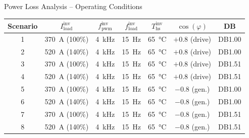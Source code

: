 \documentclass[aspectratio=169, 10pt]{beamer}
\begin{document}
\begin{frame}{Power Loss Analysis -- Operating Conditions}
  \centering
  \renewcommand{\arraystretch}{1.5}
  \begin{tabularx}{0.75\textwidth}{c c c c c c c}
    \toprule
    \textbf{Scenario} & $I_\text{load}^\text{inv}$ & $f_\text{pwm}^\text{inv}$ & $f_\text{load}^\text{inv}$ &
    $T_\text{hs}^\text{inv}$ & $\cos(\varphi)$ & \textbf{DB} \\
    \midrule
    \rowcolor{rowgray}
    1 & \SI{370}{\ampere} (100\%) & \SI{4}{\kilo\hertz} & \SI{15}{\hertz} & \SI{65}{\celsius} & $+0.8$ (drive) & DB1.00 \\
    2 & \SI{520}{\ampere} (140\%) & \SI{4}{\kilo\hertz} & \SI{15}{\hertz} & \SI{65}{\celsius} & $+0.8$ (drive) & DB1.00 \\
    \rowcolor{rowgray}
    3 & \SI{370}{\ampere} (100\%) & \SI{4}{\kilo\hertz} & \SI{15}{\hertz} & \SI{65}{\celsius} & $+0.8$ (drive) & DB1.51 \\
    4 & \SI{520}{\ampere} (140\%) & \SI{4}{\kilo\hertz} & \SI{15}{\hertz} & \SI{65}{\celsius} & $+0.8$ (drive) & DB1.51 \\
    \rowcolor{rowgray}
    5 & \SI{370}{\ampere} (100\%) & \SI{4}{\kilo\hertz} & \SI{15}{\hertz} & \SI{65}{\celsius} & $-0.8$ (gen.)  & DB1.00 \\
    6 & \SI{520}{\ampere} (140\%) & \SI{4}{\kilo\hertz} & \SI{15}{\hertz} & \SI{65}{\celsius} & $-0.8$ (gen.)  & DB1.00 \\
    \rowcolor{rowgray}
    7 & \SI{370}{\ampere} (100\%) & \SI{4}{\kilo\hertz} & \SI{15}{\hertz} & \SI{65}{\celsius} & $-0.8$ (gen.)  & DB1.51 \\
    8 & \SI{520}{\ampere} (140\%) & \SI{4}{\kilo\hertz} & \SI{15}{\hertz} & \SI{65}{\celsius} & $-0.8$ (gen.)  & DB1.51 \\
    \bottomrule
  \end{tabularx}
\end{frame}
\end{document}
